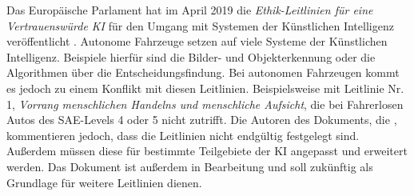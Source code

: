 Das Europäische Parlament hat im April 2019 die \textit{Ethik-Leitlinien für eine Vertrauenswürde KI} für den Umgang mit Systemen der Künstlichen Intelligenz veröffentlicht \cite{ec2019ethics}. Autonome Fahrzeuge setzen auf viele Systeme der Künstlichen Intelligenz. Beispiele hierfür sind die Bilder- und Objekterkennung oder die Algorithmen über die Entscheidungsfindung. Bei autonomen Fahrzeugen kommt es jedoch zu einem Konflikt mit diesen Leitlinien. Beispielsweise mit Leitlinie Nr. 1, \textit{Vorrang menschlichen Handelns und menschliche Aufsicht}, die bei Fahrerlosen Autos des SAE-Levels 4 oder 5 nicht zutrifft. Die Autoren des Dokuments, die \citeauthor{ec2019ethics}, kommentieren jedoch, dass die Leitlinien nicht endgültig festgelegt sind. Außerdem müssen diese für bestimmte Teilgebiete der KI angepasst und erweitert werden. Das Dokument ist außerdem in Bearbeitung und soll zukünftig als Grundlage für weitere Leitlinien dienen.\\
